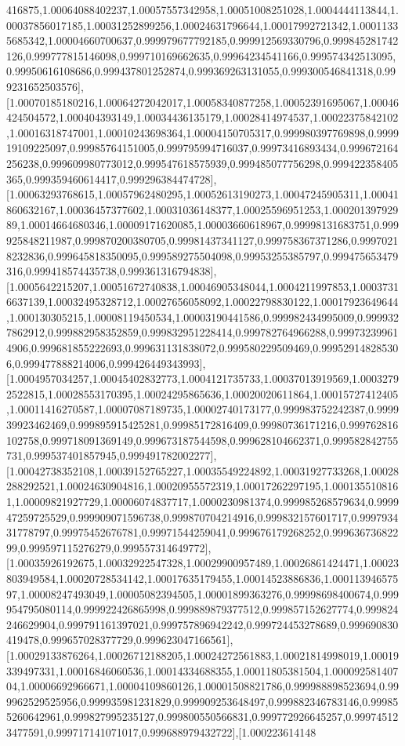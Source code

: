 \documentclass{article}
\begin{document}
416875,1.00064088402237,1.00057557342958,1.00051008251028,1.0004444113844,1.00037856017185,1.00031252899256,1.00024631796644,1.00017992721342,1.00011335685342,1.00004660700637,0.999979677792185,0.999912569330796,0.999845281742126,0.999777815146098,0.999710169662635,0.99964234541166,0.999574342513095,0.99950616108686,0.999437801252874,0.999369263131055,0.999300546841318,0.999231652503576],[1.00070185180216,1.00064272042017,1.00058340877258,1.00052391695067,1.00046424504572,1.000404393149,1.00034436135179,1.00028414974537,1.00022375842102,1.00016318747001,1.00010243698364,1.00004150705317,0.999980397769898,0.999919109225097,0.99985764151005,0.999795994716037,0.99973416893434,0.999672164256238,0.999609980773012,0.999547618575939,0.999485077756298,0.999422358405365,0.999359460614417,0.999296384474728],[1.00063293768615,1.00057962480295,1.00052613190273,1.00047245905311,1.00041860632167,1.00036457377602,1.00031036148377,1.00025596951253,1.00020139792989,1.00014664680346,1.00009171620085,1.00003660618967,0.99998131683751,0.999925848211987,0.999870200380705,0.99981437341127,0.999758367371286,0.99970218232836,0.999645818350095,0.999589275504098,0.99953255385797,0.999475653479316,0.999418574435738,0.999361316794838],[1.0005642215207,1.00051672740838,1.00046905348044,1.0004211997853,1.00037316637139,1.00032495328712,1.00027656058092,1.00022798830122,1.00017923649644,1.000130305215,1.00008119450534,1.00003190441586,0.999982434995009,0.9999327862912,0.999882958352859,0.999832951228414,0.999782764966288,0.999732399614906,0.999681855222693,0.999631131838072,0.999580229509469,0.999529148285306,0.999477888214006,0.999426449343993],[1.0004957034257,1.00045402832773,1.0004121735733,1.00037013919569,1.00032792522815,1.00028553170395,1.00024295865636,1.00020020611864,1.00015727412405,1.00011416270587,1.00007087189735,1.00002740173177,0.999983752242387,0.999939923462469,0.999895915425281,0.99985172816409,0.99980736171216,0.999762816102758,0.999718091369149,0.999673187544598,0.999628104662371,0.999582842755731,0.999537401857945,0.999491782002277],[1.00042738352108,1.00039152765227,1.00035549224892,1.00031927733268,1.00028288292521,1.00024630904816,1.00020955572319,1.00017262297195,1.0001355108161,1.00009821927729,1.00006074837717,1.0000230981374,0.999985268579634,0.999947259725529,0.999909071596738,0.999870704214916,0.999832157601717,0.999793431778797,0.99975452676781,0.99971544259041,0.999676179268252,0.99963673682299,0.999597115276279,0.999557314649772],[1.00035926192675,1.00032922547328,1.00029900957489,1.00026861424471,1.00023803949584,1.00020728534142,1.00017635179455,1.00014523886836,1.00011394657597,1.00008247493049,1.00005082394505,1.00001899363276,0.99998698400674,0.999954795080114,0.999922426865998,0.999889879377512,0.999857152627774,0.999824246629904,0.999791161397021,0.999757896942242,0.999724453278689,0.999690830419478,0.999657028377729,0.999623047166561],[1.00029133876264,1.00026712188205,1.00024272561883,1.00021814998019,1.00019339497331,1.00016846060536,1.00014334688355,1.00011805381504,1.00009258140704,1.00006692966671,1.00004109860126,1.00001508821786,0.999988898523694,0.999962529525956,0.999935981231829,0.999909253648497,0.999882346783146,0.999855260642961,0.999827995235127,0.999800550566831,0.999772926645257,0.999745123477591,0.999717141071017,0.999688979432722],[1.000223614148
\end{document}
